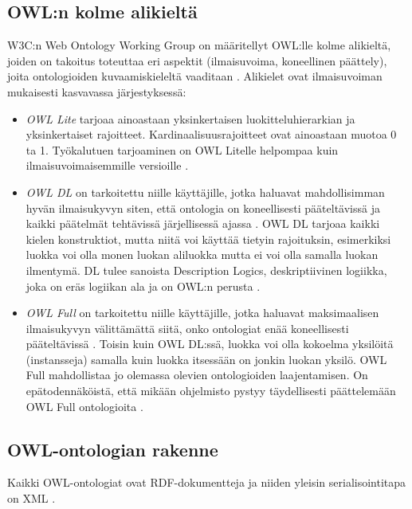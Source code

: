\documentclass[finnish]{tktltiki2}
\theoremstyle{definition}
\theoremstyle{remark}
\begin{document}
\subsection{OWL:n kolme alikieltä}

W3C:n Web Ontology Working Group on määritellyt OWL:lle kolme alikieltä, joiden
on takoitus toteuttaa eri aspektit (ilmaisuvoima, koneellinen päättely), joita
ontologioiden kuvaamiskieleltä vaaditaan \cite{MH04}. Alikielet ovat ilmaisuvoiman mukaisesti
kasvavassa järjestyksessä:

\begin{itemize}
 \item \textit{OWL Lite} tarjoaa ainoastaan yksinkertaisen luokitteluhierarkian ja yksinkertaiset rajoitteet\cite{MH04}. Kardinaalisuusrajoitteet ovat ainoastaan muotoa 0 ta 1. Työkalutuen tarjoaminen on OWL Litelle helpompaa kuin ilmaisuvoimaisemmille versioille \cite{MH04}.  
 \item \textit{OWL DL} on tarkoitettu niille käyttäjille, jotka haluavat mahdollisimman hyvän ilmaisukyvyn siten, että ontologia on koneellisesti pääteltävissä ja kaikki päätelmät tehtävissä järjellisessä ajassa \cite{MH04}. OWL DL tarjoaa kaikki kielen konstruktiot, mutta niitä voi käyttää tietyin rajoituksin, esimerkiksi luokka voi olla monen luokan aliluokka mutta ei voi olla samalla luokan ilmentymä. DL tulee sanoista Description Logics, deskriptiivinen logiikka, joka on eräs logiikan ala ja on OWL:n perusta \cite{MH04}.  
 \item \textit{OWL Full} on tarkoitettu niille käyttäjille, jotka haluavat maksimaalisen ilmaisukyvyn välittämättä siitä, onko ontologiat enää koneellisesti pääteltävissä \cite{MH04}. Toisin kuin OWL DL:ssä, luokka voi olla kokoelma yksilöitä (instansseja) samalla kuin luokka itsessään on jonkin luokan yksilö. OWL Full mahdollistaa jo olemassa olevien ontologioiden laajentamisen. On epätodennäköistä, että mikään ohjelmisto pystyy täydellisesti päättelemään OWL Full ontologioita \cite{MH04}. 
\end{itemize}

\subsection{OWL-ontologian rakenne}
Kaikki OWL-ontologiat ovat RDF-dokumentteja ja niiden yleisin serialisointitapa on XML  \cite{SWM04}.
\end{document}
